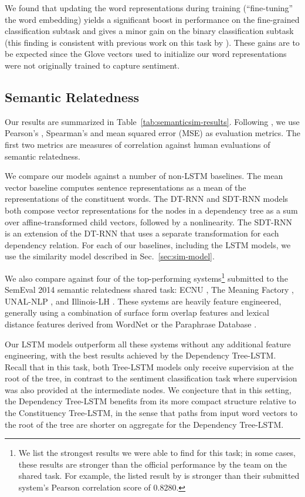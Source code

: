 \documentclass[11pt]{article}
\begin{document}
We found that updating the word representations during training (``fine-tuning'' the word embedding) yields a significant boost in performance on the fine-grained classification subtask and gives a minor gain on the binary classification subtask (this finding is consistent with previous work on this task by \citet{kim2014convolutional}). These gains are to be expected since the Glove vectors used to initialize our word representations were not originally trained to capture sentiment.

\subsection{Semantic Relatedness}

Our results are summarized in Table~\ref{tab:semanticsim-results}. Following \citet{marelli2014semeval}, we use Pearson's , Spearman's  and mean squared error (MSE) as evaluation metrics. The first two metrics are measures of correlation against human evaluations of semantic relatedness.

We compare our models against a number of non-LSTM baselines. The mean vector baseline computes sentence representations as a mean of the representations of the constituent words. The DT-RNN and SDT-RNN models \citep{socher2014grounded} both compose vector representations for the nodes in a dependency tree as a sum over affine-transformed child vectors, followed by a nonlinearity. The SDT-RNN is an extension of the DT-RNN that uses a separate transformation for each dependency relation. For each of our baselines, including the LSTM models, we use the similarity model described in Sec.~\ref{sec:sim-model}.

We also compare against four of the top-performing systems\footnote{We list the strongest results we were able to find for this task; in some cases, these results are stronger than the official performance by the team on the shared task. For example, the listed result by \citet{zhao2014ecnu} is stronger than their submitted system's Pearson correlation score of 0.8280.} submitted to the SemEval 2014 semantic relatedness shared task: ECNU \citep{zhao2014ecnu}, The Meaning Factory \citep{bjerva2014meaning}, UNAL-NLP  \citep{jimenez2014unal}, and Illinois-LH \citep{lai2014illinois}. These systems are heavily feature engineered, generally using a combination of surface form overlap features and lexical distance features derived from WordNet or the Paraphrase Database \citep{ganitkevitch2013ppdb}.

Our LSTM models outperform all these systems without any additional feature engineering, with the best results achieved by the Dependency Tree-LSTM. Recall that in this task, both Tree-LSTM models only receive supervision at the root of the tree, in contrast to the sentiment classification task where supervision was also provided at the intermediate nodes. We conjecture that in this setting, the Dependency Tree-LSTM benefits from its more compact structure relative to the Constituency Tree-LSTM, in the sense that paths from input word vectors to the root of the tree are shorter on aggregate for the Dependency Tree-LSTM.
\end{document}
